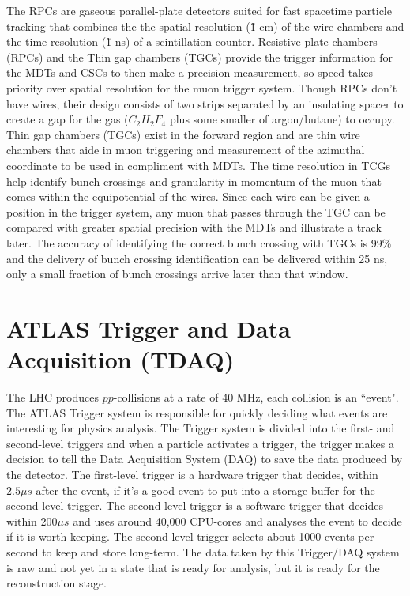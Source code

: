 The RPCs are gaseous parallel-plate detectors suited for fast spacetime particle tracking that combines the the spatial resolution (\~ 1 cm) of the wire chambers and the time resolution (\~ 1 ns) of a scintillation counter.
Resistive plate chambers (RPCs) and the Thin gap chambers (TGCs) provide the trigger information for the MDTs and CSCs to then make a precision measurement, so speed takes priority over spatial resolution for the muon trigger system. 
Though RPCs don't have wires, their design consists of two strips separated by an insulating spacer to create a gap for the gas ($C_2 H_2 F_4$ plus some smaller of argon/butane) to occupy.
Thin gap chambers (TGCs) exist in the forward region and are thin wire chambers that aide in muon triggering and measurement of the azimuthal coordinate to be used in compliment with MDTs.
The time resolution in TCGs help identify bunch-crossings and granularity in momentum of the muon that comes within the equipotential of the wires. 
Since each wire can be given a position in the trigger system, any muon that passes through the TGC can be compared with greater spatial precision with the MDTs and illustrate a track later.
The accuracy of identifying the correct bunch crossing with TGCs is 99\% and the delivery of bunch crossing identification can be delivered within 25 ns, only a small fraction of bunch crossings arrive later than that window.

\section{ATLAS Trigger and Data Acquisition (TDAQ)}

The LHC produces $pp$-collisions at a rate of 40 MHz, each collision is an ``event". 
The ATLAS Trigger system is responsible for quickly deciding what events are interesting for physics analysis.
The Trigger system is divided into the first- and second-level triggers and when a particle activates a trigger, the trigger makes a decision to tell the Data Acquisition System (DAQ) to save the data produced by the detector. 
The first-level trigger is a hardware trigger that decides, within $2.5 \mu s$ after the event, if it's a good event to put into a storage buffer for the second-level trigger.
The second-level trigger is a software trigger that decides within $200 \mu s$ and uses around 40,000 CPU-cores and analyses the event to decide if it is worth keeping. 
The second-level trigger selects about 1000 events per second to keep and store long-term.\cite{Trigger-DAQ}
The data taken by this Trigger/DAQ system is raw and not yet in a state that is ready for analysis, but it is ready for the reconstruction stage. 

